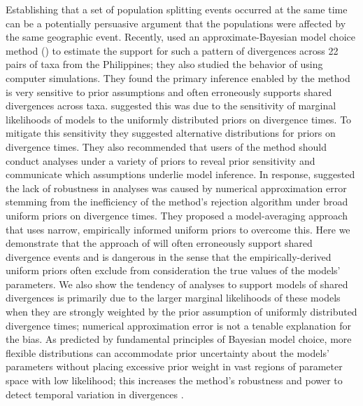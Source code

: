 Establishing that a set of population splitting events occurred at the same
time can be a potentially persuasive argument that the populations were
affected by the same geographic event.
Recently, \citet{Oaks2012} used an approximate-Bayesian model choice method
(\msb) to estimate the support for such a pattern of divergences across 22
pairs of taxa from the Philippines; they also studied the behavior of \msb
using computer simulations.
They found the primary inference enabled by the method is very sensitive to
prior assumptions and often erroneously supports shared divergences across
taxa.
\citet{Oaks2012} suggested this was due to the sensitivity of marginal
likelihoods of models to the uniformly distributed priors on divergence times.
To mitigate this sensitivity they suggested alternative distributions for
priors on divergence times.
They also recommended that users of the method should conduct analyses under a
variety of priors to reveal prior sensitivity and communicate which assumptions
underlie model inference.
In response, \citet{Hickerson2013} suggested the lack of robustness in \msb
analyses was caused by numerical approximation error stemming from the
inefficiency of the method's rejection algorithm under broad uniform priors on
divergence times.
They proposed a model-averaging approach that uses narrow, empirically informed
uniform priors to overcome this.
Here we demonstrate that the approach of \citet{Hickerson2013} will often
erroneously support shared divergence events and is dangerous in the sense that
the empirically-derived uniform priors often exclude from consideration the
true values of the models' parameters.
We also show the tendency of \msb analyses to support models of shared
divergences is primarily due to the larger marginal likelihoods of these models
when they are strongly weighted by the prior assumption of uniformly
distributed divergence times; numerical approximation error is not a tenable
explanation for the bias.
As predicted by fundamental principles of Bayesian model choice, more flexible
distributions can accommodate prior uncertainty about the models' parameters
without placing excessive prior weight in vast regions of parameter space with
low likelihood;
this increases the method's robustness and power to detect temporal variation
in divergences \citep{Oaks2014dpp}.
